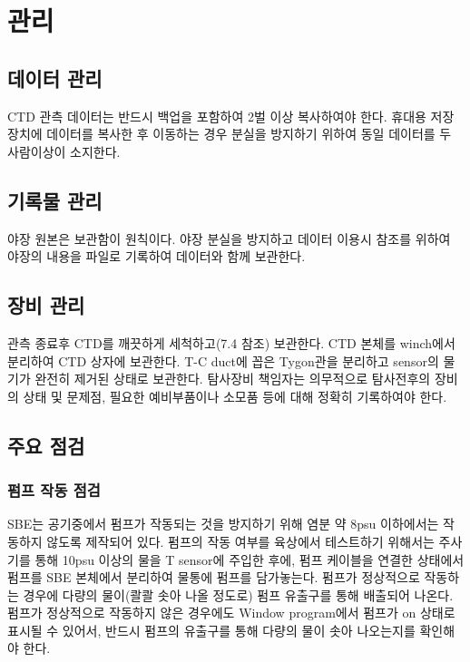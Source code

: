\documentclass[
]{book}
\begin{document}
\hypertarget{uxad00uxb9ac}{%
\section{관리}\label{uxad00uxb9ac}}

\hypertarget{uxb370uxc774uxd130-uxad00uxb9ac}{%
\subsection{데이터 관리}\label{uxb370uxc774uxd130-uxad00uxb9ac}}

CTD 관측 데이터는 반드시 백업을 포함하여 2벌 이상 복사하여야 한다. 휴대용 저장장치에 데이터를 복사한 후 이동하는 경우 분실을 방지하기 위하여 동일 데이터를 두 사람이상이 소지한다.

\hypertarget{uxae30uxb85duxbb3c-uxad00uxb9ac}{%
\subsection{기록물 관리}\label{uxae30uxb85duxbb3c-uxad00uxb9ac}}

야장 원본은 보관함이 원칙이다. 야장 분실을 방지하고 데이터 이용시 참조를 위하여 야장의 내용을 파일로 기록하여 데이터와 함께 보관한다.

\hypertarget{uxc7a5uxbe44-uxad00uxb9ac}{%
\subsection{장비 관리}\label{uxc7a5uxbe44-uxad00uxb9ac}}

관측 종료후 CTD를 깨끗하게 세척하고(7.4 참조) 보관한다. CTD 본체를 winch에서 분리하여 CTD 상자에 보관한다. T-C duct에 꼽은 Tygon관을 분리하고 sensor의 물기가 완전히 제거된 상태로 보관한다. 탐사장비 책임자는 의무적으로 탐사전후의 장비의 상태 및 문제점, 필요한 예비부품이나 소모품 등에 대해 정확히 기록하여야 한다.

\hypertarget{uxc8fcuxc694-uxc810uxac80}{%
\subsection{주요 점검}\label{uxc8fcuxc694-uxc810uxac80}}

\hypertarget{uxd38cuxd504-uxc791uxb3d9-uxc810uxac80}{%
\subsubsection{펌프 작동 점검}\label{uxd38cuxd504-uxc791uxb3d9-uxc810uxac80}}

SBE는 공기중에서 펌프가 작동되는 것을 방지하기 위해 염분 약 8psu 이하에서는 작동하지 않도록 제작되어 있다. 펌프의 작동 여부를 육상에서 테스트하기 위해서는 주사기를 통해 10psu 이상의 물을 T sensor에 주입한 후에, 펌프 케이블을 연결한 상태에서 펌프를 SBE 본체에서 분리하여 물통에 펌프를 담가놓는다. 펌프가 정상적으로 작동하는 경우에 다량의 물이(콸콸 솟아 나올 정도로) 펌프 유출구를 통해 배출되어 나온다. 펌프가 정상적으로 작동하지 않은 경우에도 Window program에서 펌프가 on 상태로 표시될 수 있어서, 반드시 펌프의 유출구를 통해 다량의 물이 솟아 나오는지를 확인해야 한다.
\end{document}
